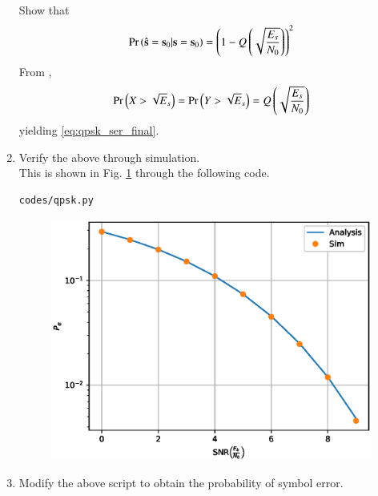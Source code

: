 \documentclass[journal,12pt,twocolumn]{IEEEtran}
\renewcommand\thesection{\arabic{section}}
\begin{document}
\begin{enumerate}[label=\arabic*.,ref=\thesection.\theenumi]
Show that 
\begin{equation}
\Pr\left(\hat{\mathbf{s}} = \mathbf{s}_0|\mathbf{s} = \mathbf{s}_0\right) 
 = \left(1-Q\left(\sqrt{\frac{E_s}{N_0}}\right)\right)^2
\label{eq:qpsk_ser_final}
\end{equation}
\solution From \label{prob:qpsk_xy}, 
\begin{align}
\Pr\left(X > \sqrt{E}_s\right) = \Pr\left(Y > \sqrt{E}_s\right) = Q\left(\sqrt{\frac{E_s}{N_0}}\right)
\end{align}
yielding \eqref{eq:qpsk_ser_final}.

\item

Verify the above through simulation.
\\
\solution 
This is shown in Fig. \ref{fig:ee18btech11042_qpsk} through the following code.
\begin{lstlisting}
codes/qpsk.py
\end{lstlisting}
%
\begin{figure}[!ht]
\centering
\includegraphics[width=\columnwidth]{./figs/qpsk.eps}
\caption{}
\label{fig:ee18btech11042_qpsk}
\end{figure}

\item
Modify the above script to obtain the probability of symbol error.


\end{enumerate}
\end{document}
